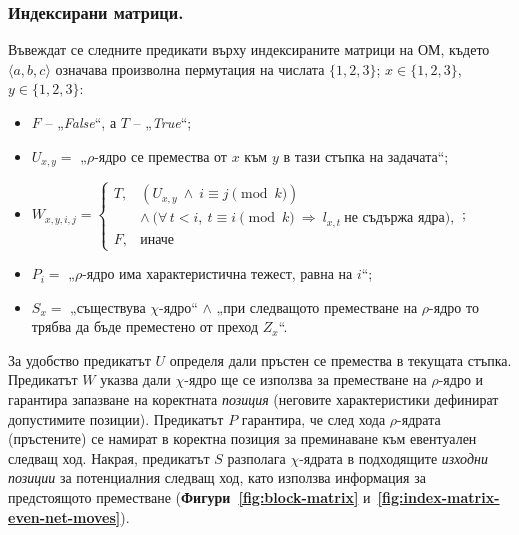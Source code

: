 \subsubsection*{Индексирани матрици.}

Въвеждат се следните предикати върху индексираните матрици на ОМ, където \(\langle a,b,c\rangle\) означава произволна пермутация на числата \(\{1,2,3\}\); \(x\in\{1,2,3\}\), \(y\in\{1,2,3\}\):
\begin{itemize}
	\item \(F\) -- „\textit{False}“, а \(T\) -- „\textit{True}“;
	\item \(U_{x,y}=\) „\(\rho\)-ядро се премества от \(x\) към \(y\) в тази стъпка на задачата“;
	\item
	\(
	W_{x,y,i,j}=
	\begin{cases}
		T, & (U_{x,y}\ \wedge\ i\equiv j \pmod{k})\\
		& \wedge\ \bigl(\forall\, t<i,\ t\equiv i \pmod{k}\ \Rightarrow\ l_{x,t}\ \text{не съдържа ядра}\bigr),\\
		F, & \text{иначе}
	\end{cases}
	\);
	\item \(P_i=\) „\(\rho\)-ядро има характеристична тежест, равна на \(i\)“;
	\item \(S_{x}=\) „съществува \(\chi\)-ядро“ \(\land\) „при следващото преместване на \(\rho\)-ядро то трябва да бъде преместено от преход \(Z_x\)“.
\end{itemize}

За удобство предикатът \(U\) определя дали пръстен се премества в текущата стъпка. Предикатът \(W\) указва дали \(\chi\)-ядро ще се използва за преместване на \(\rho\)-ядро и гарантира запазване на коректната \emph{позиция} (неговите характеристики дефинират допустимите позиции). Предикатът \(P\) гарантира, че след хода \(\rho\)-ядрата (пръстените) се намират в коректна позиция за преминаване към евентуален следващ ход. Накрая, предикатът \(S\) разполага \(\chi\)-ядрата в подходящите \emph{изходни позиции} за потенциалния следващ ход, като използва информация за предстоящото преместване (\textbf{Фигури~\ref{fig:block-matrix}} и~\textbf{\ref{fig:index-matrix-even-net-moves}}).

